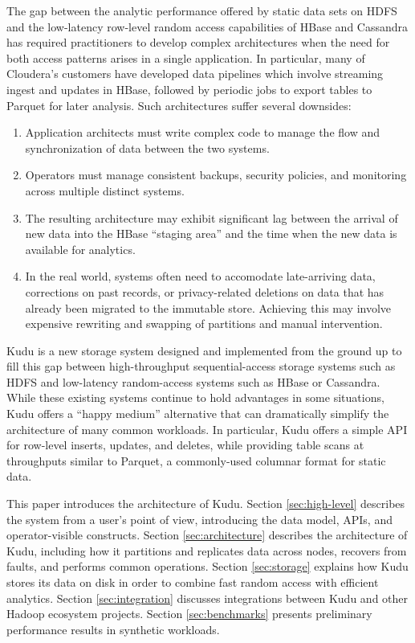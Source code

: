\documentclass{vldb}
\begin{document}
The gap between the analytic performance offered by static data sets on HDFS and the
low-latency row-level random access capabilities of HBase and Cassandra has required
practitioners to develop complex architectures when the need for both access patterns
arises in a single application. In particular, many of Cloudera's customers
have developed data pipelines which involve streaming ingest and updates in HBase, followed
by periodic jobs to export tables to Parquet for later analysis. Such architectures
suffer several downsides:

\begin{enumerate}
\item Application architects must write complex code to manage the
  flow and synchronization of data between the two systems.
\item Operators must manage consistent backups, security policies,
  and monitoring across multiple distinct systems.
\item The resulting architecture may exhibit significant lag between the arrival
  of new data into the HBase ``staging area'' and the time when the new data
  is available for analytics.
\item In the real world, systems often need to accomodate late-arriving data, corrections
  on past records, or privacy-related deletions on data that has already been
  migrated to the immutable store. Achieving this may involve expensive rewriting
  and swapping of partitions and manual intervention.
\end{enumerate}

Kudu is a new storage system designed and implemented from the ground up to fill this gap between
high-throughput sequential-access storage systems such as HDFS\cite{hdfs} and low-latency random-access
systems such as HBase or Cassandra. While these existing systems continue to hold advantages in some
situations, Kudu offers a ``happy medium'' alternative that can dramatically simplify the
architecture of many common workloads. In particular, Kudu offers a simple API for row-level
inserts, updates, and deletes, while providing table scans at throughputs similar to Parquet,
a commonly-used columnar format for static data.

This paper introduces the architecture of Kudu. Section \ref{sec:high-level} describes the system
from a user's point of view, introducing the data model, APIs, and operator-visible constructs.
Section \ref{sec:architecture} describes the architecture of Kudu, including how it partitions and
replicates data across nodes, recovers from faults, and performs common operations.  Section
\ref{sec:storage} explains how Kudu stores its data on disk in order to combine fast random
access with efficient analytics. Section \ref{sec:integration} discusses integrations between Kudu
and other Hadoop ecosystem projects. Section \ref{sec:benchmarks} presents preliminary performance
results in synthetic workloads.
\end{document}
